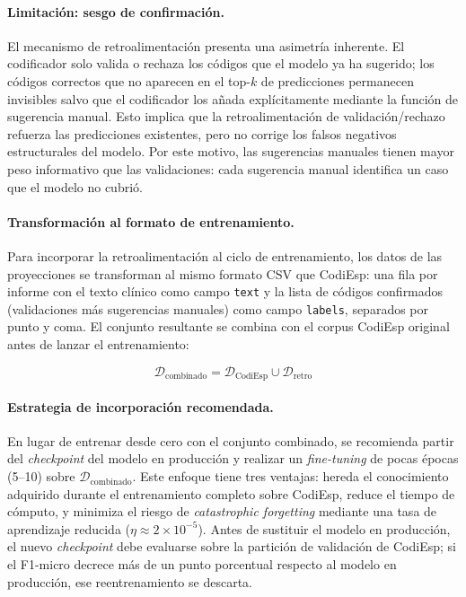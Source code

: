 \paragraph{Limitación: sesgo de confirmación.}
El mecanismo de retroalimentación presenta una asimetría inherente. El codificador solo
valida o rechaza los códigos que el modelo ya ha sugerido; los códigos correctos que no
aparecen en el top-$k$ de predicciones permanecen invisibles salvo que el codificador los
añada explícitamente mediante la función de sugerencia manual. Esto implica que la
retroalimentación de validación/rechazo refuerza las predicciones existentes, pero no corrige los
falsos negativos estructurales del modelo. Por este motivo, las sugerencias manuales tienen
mayor peso informativo que las validaciones: cada sugerencia manual identifica un caso que
el modelo no cubrió.

\paragraph{Transformación al formato de entrenamiento.}
Para incorporar la retroalimentación al ciclo de entrenamiento, los datos de las proyecciones se
transforman al mismo formato CSV que CodiEsp: una fila por informe con el texto clínico
como campo \texttt{text} y la lista de códigos confirmados (validaciones más sugerencias
manuales) como campo \texttt{labels}, separados por punto y coma. El conjunto resultante
se combina con el corpus CodiEsp original antes de lanzar el entrenamiento:

\begin{equation*}
 \mathcal{D}_{\text{combinado}} = \mathcal{D}_{\text{CodiEsp}} \cup \mathcal{D}_{\text{retro}}
\end{equation*}

\paragraph{Estrategia de incorporación recomendada.}
En lugar de entrenar desde cero con el conjunto combinado, se recomienda partir del
\emph{checkpoint} del modelo en producción y realizar un \emph{fine-tuning} de pocas
épocas (5--10) sobre $\mathcal{D}_{\text{combinado}}$. Este enfoque tiene tres ventajas:
hereda el conocimiento adquirido durante el entrenamiento completo sobre CodiEsp, reduce
el tiempo de cómputo, y minimiza el riesgo de \emph{catastrophic forgetting} mediante una
tasa de aprendizaje reducida ($\eta \approx 2 \times 10^{-5}$). Antes de sustituir el
modelo en producción, el nuevo \emph{checkpoint} debe evaluarse sobre la partición de
validación de CodiEsp; si el F1-micro decrece más de un punto porcentual respecto al
modelo en producción, ese reentrenamiento se descarta.

